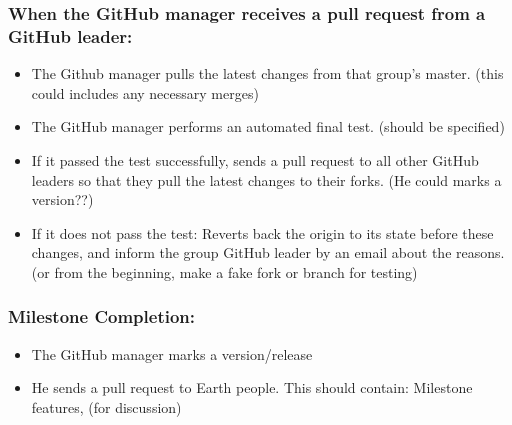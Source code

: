\documentclass{article}
\begin{document}
\subsubsection{When the GitHub manager receives a pull request from a GitHub leader:}
\begin{itemize}	
\item The Github manager pulls the latest changes from that group's master. (this could includes any necessary merges)
\item The GitHub manager performs an automated final test. (should be specified) 
\item If it passed the test successfully, sends a pull request to all other GitHub leaders so that they pull the latest changes to their forks.
(He could marks a version??)
\item If it does not pass the test: Reverts back the origin to its state before these changes, and inform the group GitHub leader by an email about the reasons. (or from the beginning, make a fake fork or branch for testing)
\end{itemize}

\subsubsection{Milestone Completion:}
\begin{itemize}	
\item The GitHub manager marks a version/release 
\item He sends a pull request to Earth people. This should contain: Milestone features, (for discussion)
\end{itemize}
\end{document}
